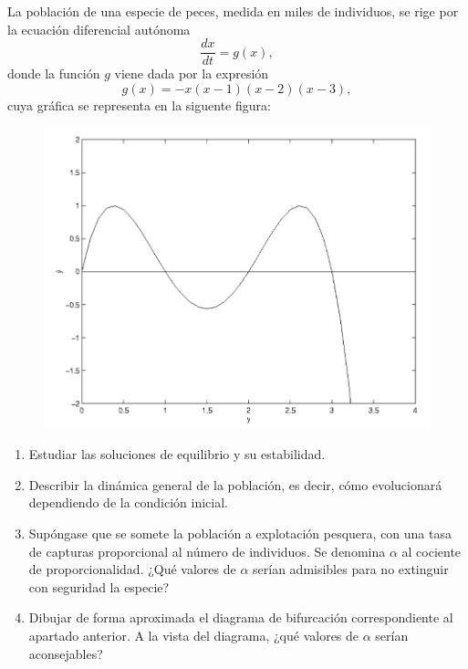 \documentclass[11pt]{report}
\begin{document}
\begin{exercise}
    La población de una especie de peces, medida en miles de individuos, se rige por la ecuación diferencial autónoma
    \[\frac{dx}{dt} = g(x),\]
    donde la función $g$ viene dada por la expresión
    \[g(x) = -x(x-1)(x-2)(x-3),\]
    cuya gráfica se representa en la siguente figura:
    \begin{figure}[H]
        \centering
        \includegraphics[scale = 0.4]{img/14.png}
    \end{figure}
    \begin{enumerate}
        \item Estudiar las soluciones de equilibrio y su estabilidad.
        \item Describir la dinámica general de la población, es decir, cómo evolucionará dependiendo de la condición inicial.
        \item Supóngase que se somete la población a explotación pesquera, con una tasa de capturas proporcional al número de individuos. Se denomina $\alpha$ al cociente de proporcionalidad. ¿Qué valores de $\alpha$ serían admisibles para no extinguir con seguridad la especie?
        \item Dibujar de forma aproximada el diagrama de bifurcación correspondiente al apartado anterior. A la vista del diagrama, ¿qué valores de $\alpha$ serían aconsejables?
    \end{enumerate}
\end{exercise}
\end{document}
